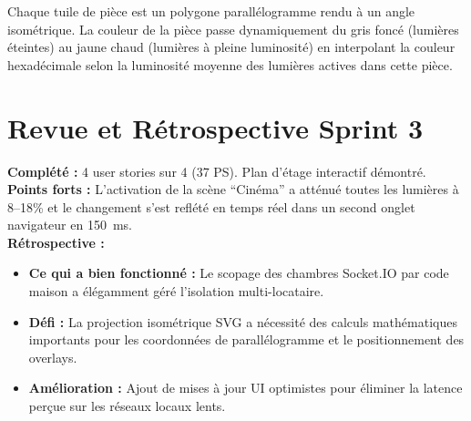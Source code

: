 \noindent Chaque tuile de pièce est un polygone parallélogramme rendu à un angle
isométrique. La couleur de la pièce passe dynamiquement du gris foncé (lumières éteintes)
au jaune chaud (lumières à pleine luminosité) en interpolant la couleur hexadécimale
selon la luminosité moyenne des lumières actives dans cette pièce.

\section{Revue et Rétrospective Sprint 3}

\begin{tcolorbox}[goalbox,title={Revue Sprint 3}]
\textbf{Complété :} 4 user stories sur 4 (37 PS). Plan d'étage interactif démontré. \\
\textbf{Points forts :} L'activation de la scène ``Cinéma'' a atténué toutes les lumières
à 8--18\% et le changement s'est reflété en temps réel dans un second onglet navigateur
en 150~ms. \\
\textbf{Rétrospective :}
\begin{itemize}[leftmargin=1cm,itemsep=2pt]
  \item \textbf{Ce qui a bien fonctionné :} Le scopage des chambres Socket.IO par code
        maison a élégamment géré l'isolation multi-locataire.
  \item \textbf{Défi :} La projection isométrique SVG a nécessité des calculs mathématiques
        importants pour les coordonnées de parallélogramme et le positionnement des overlays.
  \item \textbf{Amélioration :} Ajout de mises à jour UI optimistes pour éliminer la
        latence perçue sur les réseaux locaux lents.
\end{itemize}
\end{tcolorbox}
